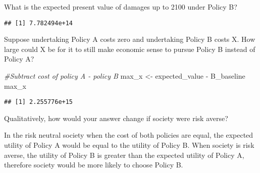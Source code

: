 \documentclass[
]{article}
\newenvironment{Shaded}{\begin{snugshade}}{\end{snugshade}}
\newcommand{\AttributeTok}[1]{\textcolor[rgb]{0.77,0.63,0.00}{#1}}
\newcommand{\CommentTok}[1]{\textcolor[rgb]{0.56,0.35,0.01}{\textit{#1}}}
\newcommand{\ConstantTok}[1]{\textcolor[rgb]{0.00,0.00,0.00}{#1}}
\newcommand{\DecValTok}[1]{\textcolor[rgb]{0.00,0.00,0.81}{#1}}
\newcommand{\FloatTok}[1]{\textcolor[rgb]{0.00,0.00,0.81}{#1}}
\newcommand{\FunctionTok}[1]{\textcolor[rgb]{0.00,0.00,0.00}{#1}}
\newcommand{\NormalTok}[1]{#1}
\newcommand{\OtherTok}[1]{\textcolor[rgb]{0.56,0.35,0.01}{#1}}
\newcommand{\SpecialCharTok}[1]{\textcolor[rgb]{0.00,0.00,0.00}{#1}}
\begin{document}
What is the expected present value of damages up to 2100 under Policy B?

\begin{Shaded}
\end{Shaded}

\begin{verbatim}
## [1] 7.782494e+14
\end{verbatim}

Suppose undertaking Policy A costs zero and undertaking Policy B costs
X. How large could X be for it to still make economic sense to pursue
Policy B instead of Policy A?

\begin{Shaded}
\begin{Highlighting}[]
\CommentTok{\#Subtract cost of policy A {-} policy B}
\NormalTok{max\_x }\OtherTok{\textless{}{-}}\NormalTok{ expected\_value }\SpecialCharTok{{-}}\NormalTok{ B\_baseline}
\NormalTok{max\_x}
\end{Highlighting}
\end{Shaded}

\begin{verbatim}
## [1] 2.255776e+15
\end{verbatim}

Qualitatively, how would your answer change if society were risk averse?

In the risk neutral society when the cost of both policies are equal,
the expected utility of Policy A would be equal to the utility of Policy
B. When society is risk averse, the utility of Policy B is greater than
the expected utility of Policy A, therefore society would be more likely
to choose Policy B.
\end{document}
